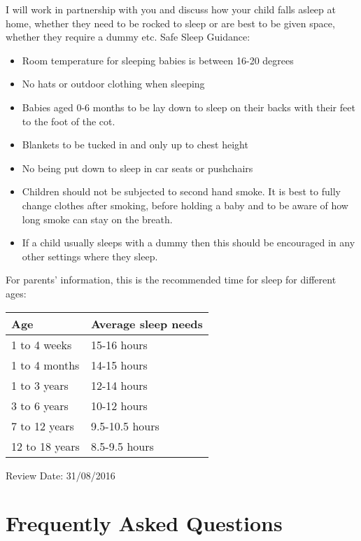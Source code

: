 I will work in partnership with you and discuss how your child falls asleep at home, whether they need to be rocked to sleep or are best to be given space, whether they require a dummy etc. 
Safe Sleep Guidance:

\begin{itemize}
\item Room temperature for sleeping babies is between 16-20 degrees
\item No hats or outdoor clothing when sleeping
\item Babies aged 0-6 months to be lay down to sleep on their backs with their feet to the foot of the cot.
\item Blankets to be tucked in and only up to chest height
\item No being put down to sleep in car seats or pushchairs
\item Children should not be subjected to second hand smoke. It is best to fully change clothes after smoking, before holding a baby and to be aware of how long smoke can stay on the breath. 
\item If a child usually sleeps with a dummy then this should be encouraged in any other settings where they sleep. 
\end{itemize}

For parents' information, this is the recommended time for sleep for different ages:

\begin{table}[h]
  \begin{tabular}{|l|l|}
    \hline
    Age & Average sleep needs \\
    \hline
    1 to 4 weeks     &   15-16 hours \\
    \hline       
    1 to 4 months &   14-15 hours \\
    \hline
    1 to 3 years &   12-14 hours \\
    \hline
    3 to 6 years &   10-12 hours \\
    \hline
    7 to 12 years &   9.5-10.5 hours \\
    \hline
    12 to 18 years &   8.5-9.5 hours \\
    \hline
  \end{tabular}
\end{table}

Review Date: 31/08/2016

\appendix
\section{Frequently Asked Questions}

